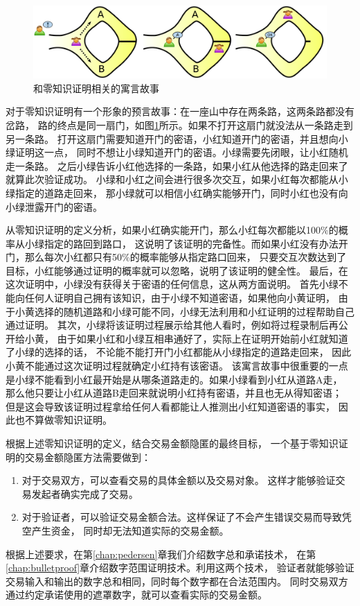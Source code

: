 \begin{figure}
    \centering
    \includegraphics[width=\textwidth]{figures/alibaba.png}
    \caption{和零知识证明相关的寓言故事\cite{wikipedia_2021}}
    \label{fig:alibaba}
\end{figure}

对于零知识证明有一个形象的预言故事：在一座山中存在两条路，这两条路都没有岔路，
路的终点是同一扇门，如图\ref{fig:alibaba}所示。如果不打开这扇门就没法从一条路走到另一条路。
打开这扇门需要知道开门的密语，小红知道开门的密语，并且想向小绿证明这一点，
同时不想让小绿知道开门的密语。小绿需要先闭眼，让小红随机走一条路。
之后小绿告诉小红他选择的一条路，如果小红从他选择的路走回来了就算此次验证成功。
小绿和小红之间会进行很多次交互，如果小红每次都能从小绿指定的道路走回来，
那小绿就可以相信小红确实能够开门，同时小红也没有向小绿泄露开门的密语。

从零知识证明的定义分析，如果小红确实能开门，那么小红每次都能以100\%的概率从小绿指定的路回到路口，
这说明了该证明的完备性。而如果小红没有办法开门，那么每次小红都只有50\%的概率能够从指定路口回来，
只要交互次数达到了目标，小红能够通过证明的概率就可以忽略，说明了该证明的健全性。
最后，在这次证明中，小绿没有获得关于密语的任何信息，这从两方面说明。
首先小绿不能向任何人证明自己拥有该知识，由于小绿不知道密语，如果他向小黄证明，
由于小黄选择的随机道路和小绿可能不同，小绿无法利用和小红证明的过程帮助自己通过证明。
其次，小绿将该证明过程展示给其他人看时，例如将过程录制后再公开给小黄，
由于如果小红和小绿互相串通好了，实际上在证明开始前小红就知道了小绿的选择的话，
不论能不能打开门小红都能从小绿指定的道路走回来，
因此小黄不能通过这次证明过程就确定小红持有该密语。
该寓言故事中很重要的一点是小绿不能看到小红最开始是从哪条道路走的。如果小绿看到小红从道路A走，
那么他只要让小红从道路B走回来就说明小红持有密语，并且也无从得知密语；
但是这会导致该证明过程拿给任何人看都能让人推测出小红知道密语的事实，
因此也不算做零知识证明。

根据上述零知识证明的定义，结合交易金额隐匿的最终目标，
一个基于零知识证明的交易金额隐匿方法需要做到：

\begin{enumerate}
    \item 对于交易双方，可以查看交易的具体金额以及交易对象。
    这样才能够验证交易发起者确实完成了交易。
    \item 对于验证者，可以验证交易金额合法。这样保证了不会产生错误交易而导致凭空产生资金，
    同时却无法知道实际的交易金额。
\end{enumerate}

根据上述要求，在第\ref{chap:pedersen}章我们介绍数字总和承诺技术，
在第\ref{chap:bulletproof}章介绍数字范围证明技术。利用这两个技术，
验证者就能够验证交易输入和输出的数字总和相同，同时每个数字都在合法范围内。
同时交易双方通过约定承诺使用的遮罩数字，就可以查看实际的交易金额。